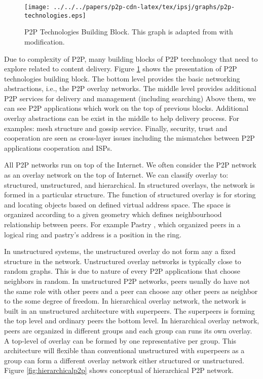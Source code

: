 \begin{figure}[tb]
\begin{center}
\texttt{[image: ../../../papers/p2p-cdn-latex/tex/ipsj/graphs/p2p-technologies.eps]}
\end{center}
\caption{P2P Technologies Building Block. This graph is adapted from \cite{Passarella20121} with modification.} 
\label{fig:p2ptech}
\end{figure}

Due to complexity of P2P, many building blocks of P2P teechnology that need to explore related to content delivery. 
Figure \ref{fig:p2ptech} shows the presentation of P2P technologies building block.
The bottom level provides the basic networking abstractions, i.e., the P2P overlay networks. 
The middle level provides additional P2P services for delivery and management (including searching)
Above them, we can see P2P applications which work on the top of previous blocks.
Additional overlay abstractions can be exist in the middle to help delivery process. 
For examples:  mesh structure and gossip service.
Finally, security, trust and cooperation are seen as cross-layer issues including the mismatches between P2P applications cooperation and ISPs.

All P2P networks run on top of the Internet. 
We often consider the P2P network as an overlay network on the top of Internet. 
We can classify overlay to: structured, unstructured, and hierarchical. 
In structured overlays, the network is formed in a particular structure. 
The function of structured overlay is for storing and locating objects based on defined virtual address space. 
The space is organized according to a given geometry which defines neighbourhood relationship between peers.
For example Pastry \cite{Rowstron:2001:PSD:646591.697650}, which organized peers in a logical ring and pastry's address is a position in the ring. 

In unstructured systems, the unstructured overlay do not form any a fixed structure in the network. 
Unstructured overlay networks is typically close to random graphs. 
This is due to nature of every P2P applications that choose neighbors in random.
In unstructured P2P networks, peers usually do have not the same role with other peers and a peer can choose any other peers as neighbor to the some degree of freedom.  
In hierarchical overlay network, the network is built in an unstructured architecture with superpeers.
The superpeers is forming the top level and ordinary peers the bottom level.
In hierarchical overlay network, peers are organized in different groups and each group can runs its own overlay. 
A top-level of overlay can be formed by one representative per group.
This architecture will flexible than conventional unstructured with superpeers as a group can form a different overlay network either structured or unstructured. 
Figure \ref{fig:hierarchicalp2p} shows conceptual of hierarchical P2P network. 

